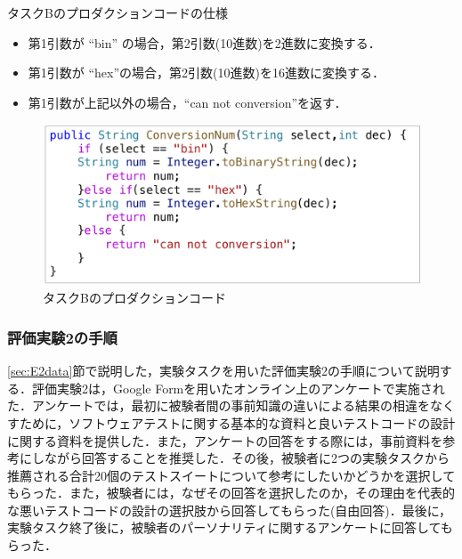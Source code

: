 \documentclass[12pt]{jarticle} %
\begin{document}
\begin{description}
\begin{itembox}[l]{タスクBのプロダクションコードの仕様}
\begin{itemize}
\item 第1引数が ``bin'' の場合，第2引数(10進数)を2進数に変換する．
\item 第1引数が ``hex''の場合，第2引数(10進数)を16進数に変換する．
\item 第1引数が上記以外の場合，``can not conversion''を返す．
\end{itemize}
\end{itembox}

\begin{figure}[htbp]
\begin{center}
\includegraphics[clip,width=12cm]{image/taskB.pdf}
\caption{タスクBのプロダクションコード}
\label{TaskB}
\end{center}
\end{figure}

\end{description}

\subsubsection{評価実験2の手順}
\label{sec:E2process}

\ref{sec:E2data}節で説明した，実験タスクを用いた評価実験2の手順について説明する．評価実験2は，Google Formを用いたオンライン上のアンケートで実施された．アンケートでは，最初に被験者間の事前知識の違いによる結果の相違をなくすために，ソフトウェアテストに関する基本的な資料と良いテストコードの設計に関する資料を提供した．また，アンケートの回答をする際には，事前資料を参考にしながら回答することを推奨した．その後，被験者に2つの実験タスクから推薦される合計20個のテストスイートについて参考にしたいかどうかを選択してもらった．また，被験者には，なぜその回答を選択したのか，その理由を代表的な悪いテストコードの設計の選択肢から回答してもらった(自由回答)．最後に，実験タスク終了後に，被験者のパーソナリティに関するアンケートに回答してもらった．
\end{document}
